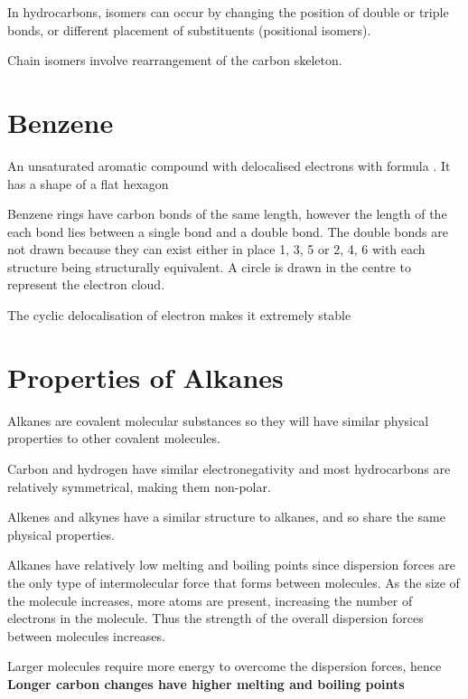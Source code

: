 	In hydrocarbons, isomers can occur by changing the position of double or triple bonds, or different placement of substituents (positional isomers).

	Chain isomers involve rearrangement of the carbon skeleton.

\section{Benzene}

	An unsaturated aromatic compound with delocalised electrons with formula . It has a shape of a flat hexagon

	Benzene rings have carbon bonds of the same length, however the length of the each bond lies between a single bond and a double bond. The double bonds are not drawn because they can exist either in place 1, 3, 5 or 2, 4, 6 with each structure being structurally equivalent. A circle is drawn in the centre to represent the electron cloud.
	
	\begin{center}
	\end{center}

	The cyclic delocalisation of electron makes it extremely stable

\section{Properties of Alkanes}

	Alkanes are covalent molecular substances so they will have similar physical properties to other covalent molecules.

	Carbon and hydrogen have similar electronegativity and most hydrocarbons are relatively symmetrical, making them non-polar.

	Alkenes and alkynes have a similar structure to alkanes, and so share the same physical properties.

	Alkanes have relatively low melting and boiling points since dispersion forces are the only type of intermolecular force that forms between molecules. As the size of the molecule increases, more atoms are present, increasing the number of electrons in the molecule. Thus the strength of the overall dispersion forces between molecules increases.

	Larger molecules require more energy to overcome the dispersion forces, hence \textbf{Longer carbon changes have higher melting and boiling points}

